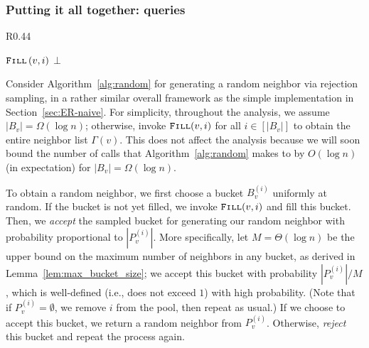 \subsubsection{Putting it all together:  queries}
\label{sec:random_neighbor}

\begin{wrapfigure}[17]{R}{0.44\textwidth}
\vspace{-1.5em}
\begin{framed}
    \renewcommand\figurename{Algorithm}
    \caption{Bucketing Generator}
    \label{alg:random}
    \begin{algorithmic}
                    \State$\texttt{\textsc{Fill}}\left( v,i\right)$
                \EndIf
                \Else
                \EndIf
            \EndWhile
            \State \Return $\bot$
        \EndProcedure
    \end{algorithmic}
\end{framed}
\end{wrapfigure}

Consider Algorithm~\ref{alg:random} for generating a random neighbor via rejection sampling, in a rather similar overall framework as the simple implementation in Section~\ref{sec:ER-naive}.
For simplicity, throughout the analysis, we assume $|B_v| = \Omega(\log n)$; otherwise, invoke $\texttt{\textsc{Fill}}(v,i)$ for all $i \in [|B_v|]$ to obtain the entire neighbor list $\Gamma(v)$. This does not affect the analysis because we will soon bound the number of calls that Algorithm~\ref{alg:random} makes to  by $O(\log n)$ (in expectation) for $|B_v| = \Omega(\log n)$.

To obtain a random neighbor, we first choose a bucket $B_v^{(i)}$ uniformly at random.
If the bucket is not yet filled, we invoke $\texttt{\textsc{Fill}}(v,i)$ and fill this bucket.
Then, we \emph{accept} the sampled bucket for generating our random neighbor with probability proportional to $|P_v^{(i)}|$. More specifically, let $M = \Theta(\log n)$ be the upper bound on the maximum number of neighbors in any bucket, as derived in Lemma~\ref{lem:max_bucket_size}; we accept this bucket with probability $|P_v^{(i)}|/M$, which is well-defined (i.e., does not exceed $1$) with high probability. 
(Note that if $P_v^{(i)} = \emptyset$, we remove $i$ from the pool, then repeat as usual.) 
If we choose to accept this bucket, we return a random neighbor from $P_v^{(i)}$.
Otherwise, \emph{reject} this bucket and repeat the process again.

